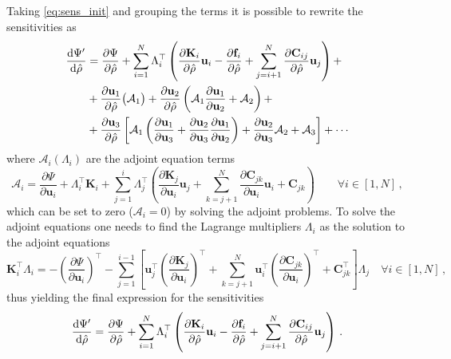 Taking \autoref{eq:sens_init} and grouping the terms it is possible to rewrite the sensitivities as
\begin{align}
    \frac{\mathop{}\!\text{d} \Psi^\prime}{\mathop{}\!\text{d} \hat{\rho}}  &= \frac{\partial \Psi}{\partial \hat{\rho}} + \sum^N_{i=1} \Lambda_{i}^{\top} \left( \frac{\partial \mathbf{K}_i}{\partial \hat{\rho}} \mathbf{u}_i - \frac{\partial \mathbf{f}_i}{\partial \hat{\rho}} + \sum_{j=i+1}^{N} \frac{\partial \mathbf{C}_{ij}}{\partial \hat{\rho} } \mathbf{u}_j \right) + \\ &+ \frac{\partial \mathbf{u}_1}{\partial \hat{\rho}} \big( \mathcal{A}_1 \big) + \frac{\partial \mathbf{u}_2}{\partial \hat{\rho}} \left( \mathcal{A}_1 \frac{\partial \mathbf{u}_1}{\partial \mathbf{u}_2} + \mathcal{A}_2 \right) + \\
    &+ \frac{\partial \mathbf{u}_3}{\partial \hat{\rho}} \left[ \mathcal{A}_1 \left( \frac{\partial \mathbf{u}_1}{\partial \mathbf{u}_3} + \frac{\partial \mathbf{u}_2}{\partial \mathbf{u}_3}\frac{\partial \mathbf{u}_1}{\partial \mathbf{u}_2}\right) + \frac{\partial \mathbf{u}_2}{\partial \mathbf{u}_3} \mathcal{A}_2 + \mathcal{A}_3 \right] + \cdots
\end{align}
where $\mathcal{A}_i (\Lambda_i)$ are the adjoint equation terms
\begin{equation}
    \mathcal{A}_i = \frac{\partial \Psi}{\partial \mathbf{u}_i} + \Lambda_i^\top \mathbf{K}_i + \sum_{j=1}^{i} \Lambda_j^\top\left(
     \frac{\partial \mathbf{K}_j}{\partial \mathbf{u}_i}\mathbf{u}_j + \sum^N_{k=j+1} \frac{\partial \mathbf{C}_{jk}}{\partial \mathbf{u}_i} \mathbf{u}_i + \mathbf{C}_{jk}\right) \quad \quad \forall i \in [1, N] \,,
\end{equation}
which can be set to zero ($\mathcal{A}_i=0$) by solving the adjoint problems. 
To solve the adjoint equations one needs to find the Lagrange multipliers $\Lambda_i$ as the solution to the adjoint equations
\begin{equation}\label{eq:app_adj_eqs}
     \mathbf{K}^\top_i \Lambda_i = -\left(\frac{\partial \Psi}{\partial \mathbf{u}_i}\right)^\top - \sum_{j=1}^{i-1} \left[ 
     \mathbf{u}^\top_j \left(\frac{\partial \mathbf{K}_j}{\partial \mathbf{u}_i}\right)^\top  + \sum^N_{k=j+1} \mathbf{u}^\top_i \left(\frac{\partial \mathbf{C}_{jk}}{\partial \mathbf{u}_i}\right)^\top + \mathbf{C}^\top_{jk} \right]\Lambda_j  \quad \forall i \in [1, N] \,,
\end{equation}
thus yielding the final expression for the sensitivities
\begin{equation}
    \frac{\mathop{}\!\text{d} \Psi^\prime}{\mathop{}\!\text{d} \hat{\rho}}  = \frac{\partial \Psi}{\partial \hat{\rho}} + \sum^N_{i=1} \Lambda_{i}^{\top} \left( \frac{\partial \mathbf{K}_i}{\partial \hat{\rho}} \mathbf{u}_i - \frac{\partial \mathbf{f}_i}{\partial \hat{\rho}} + \sum^N_{j=i+1} \frac{\partial \mathbf{C}_{ij}}{\partial \hat{\rho}} \mathbf{u}_j \right)\,.
\end{equation}
